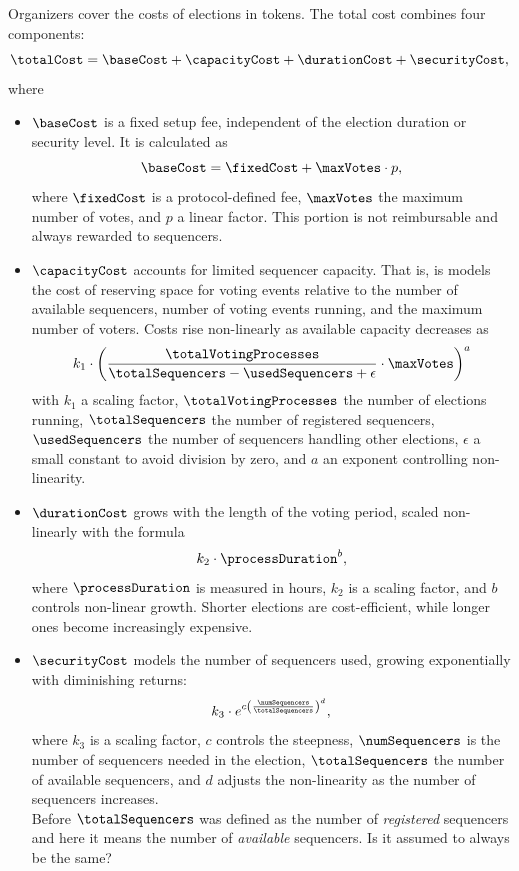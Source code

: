 Organizers cover the costs of elections in \token tokens. The total cost combines four components:
\[	\totalCost = \baseCost + \capacityCost + \durationCost + \securityCost,  \]
where
%
\begin{itemize}
	\item $\baseCost$ is a fixed setup fee, independent of the election duration or security level. It is calculated as
	\[
	\baseCost = \fixedCost + \maxVotes \cdot p, 
	\]
	where $\fixedCost$ is a protocol-defined fee, $\maxVotes$ the maximum number of votes{\color{blue}{ (votes or voters?)}}, and $p$ a linear factor. This portion is not reimbursable and always rewarded to sequencers.
	
	\item $\capacityCost$ accounts for limited sequencer capacity. That is, is models the cost of reserving space for voting events relative to the number of available sequencers, number of voting events running, and the maximum number of voters. Costs rise non-linearly as available capacity decreases as
	\[
	k_1 \cdot \left( \frac{\totalVotingProcesses}{\totalSequencers - \usedSequencers + \epsilon} \cdot \maxVotes \right)^a
	\]
	with $k_1$ a scaling factor, $\totalVotingProcesses$ the number of elections running, $\totalSequencers$ the number of registered sequencers, $\usedSequencers$ the number of sequencers handling other elections, $\epsilon$ a small constant to avoid division by zero, and $a$ an exponent controlling non-linearity.  
	
	\item $\durationCost$ grows with the length of the voting period, scaled non-linearly with the formula
	\[
	k_2 \cdot \processDuration^b, 
	\]
	where $\processDuration$ is measured in hours, $k_2$ is a scaling factor, and $b$ controls non-linear growth. Shorter elections are cost-efficient, while longer ones become increasingly expensive.
	
	\item $\securityCost$ models the number of sequencers used, growing exponentially with diminishing returns:  
	\[
	k_3 \cdot e^{c \left( \frac{\numSequencers}{\totalSequencers} \right)^d}, 
	\]
	where $k_3$ is a scaling factor, $c$ controls the steepness, $\numSequencers$ is the number of sequencers needed in the election, $\totalSequencers$ the number of available sequencers, and $d$ adjusts the non-linearity as the number of sequencers increases.\\
	{\color{blue}Before $\totalSequencers$ was defined as the number of \textit{registered} sequencers and here it means the number of \textit{available} sequencers. Is it assumed to always be the same?}
\end{itemize}


